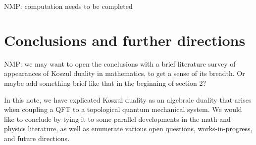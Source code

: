 \documentclass[11pt]{amsart}
\def\brian#1{{\textcolor{blue!65!red}{BRW: {#1}}}}
\def\natalie#1{{\textcolor{green!65!black}{NMP: {#1}}}}
\begin{document}
\natalie{computation needs to be completed}



%

\section{Conclusions and further directions}\label{s:conclusions}

\natalie{we may want to open the conclusions with a brief literature survey of appearances of Koszul duality in mathematics, to get a sense of its breadth. Or maybe add something brief like that in the beginning of section 2?}

In this note, we have explicated Koszul duality as an algebraic duality that arises when coupling a QFT to a topological quantum mechanical system. We would like to conclude by tying it to some parallel developments in the math and physics literature, as well as enumerate various open questions, works-in-progress, and future directions.
\end{document}
